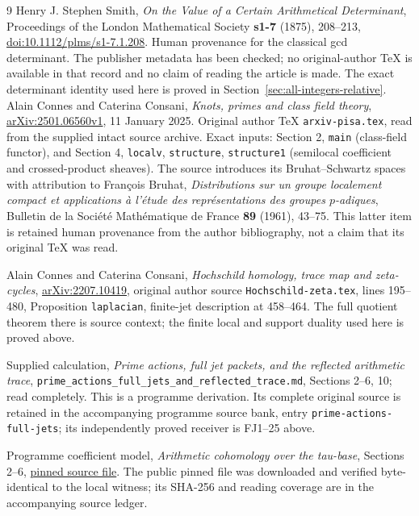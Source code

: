 \documentclass[11pt,a4paper]{article}
\theoremstyle{definition}\newtheorem{definition}[theorem]{Definition}
\begin{document}
\begin{thebibliography}{9}
Henry J. Stephen Smith, \emph{On the Value of a Certain Arithmetical Determinant},
Proceedings of the London Mathematical Society \textbf{s1-7} (1875), 208--213,
\href{https://doi.org/10.1112/plms/s1-7.1.208}{doi:10.1112/plms/s1-7.1.208}.
Human provenance for the classical gcd determinant. The publisher metadata
has been checked; no original-author TeX is available in that record and
no claim of reading the article is made. The exact determinant identity
used here is proved in Section~\ref{sec:all-integers-relative}.
Alain Connes and Caterina Consani, \emph{Knots, primes and class field theory},
\href{https://arxiv.org/abs/2501.06560v1}{arXiv:2501.06560v1}, 11 January 2025.
Original author TeX \texttt{arxiv-pisa.tex}, read from the supplied intact source
archive. Exact inputs: Section 2, \texttt{main} (class-field functor),
and Section 4, \texttt{localv}, \texttt{structure}, \texttt{structure1}
(semilocal coefficient and crossed-product sheaves).
The source introduces its Bruhat--Schwartz spaces with attribution to
Fran\c{c}ois Bruhat, \emph{Distributions sur un groupe localement compact
et applications \`a l'\'etude des repr\'esentations des groupes $p$-adiques},
Bulletin de la Soci\'et\'e Math\'ematique de France \textbf{89} (1961), 43--75.
This latter item is retained human provenance from the author bibliography,
not a claim that its original TeX was read.

 Alain Connes and Caterina Consani,
\emph{Hochschild homology, trace map and zeta-cycles},
\href{https://arxiv.org/abs/2207.10419}{arXiv:2207.10419}, original
author source \texttt{Hochschild-zeta.tex}, lines 195--480,
Proposition \texttt{laplacian}, finite-jet description at 458--464.
The full quotient theorem there is source context; the finite local
and support duality used here is proved above.

 Supplied calculation,
\emph{Prime actions, full jet packets, and the reflected arithmetic trace},
\texttt{prime\_actions\_full\_jets\_and\_reflected\_trace.md},
Sections 2--6, 10; read completely. This is a programme derivation. Its complete original source is retained in the accompanying programme source bank, entry \texttt{prime-actions-full-jets}; its independently proved receiver is FJ1--25 above.

 Programme coefficient model,
\emph{Arithmetic cohomology over the tau-base}, Sections 2--6,
\href{https://github.com/KokunoYumeto/zeta-function-research-reader/blob/4ba9285b66af58a6d58fc502a494c1fb45ca5b79/workbenches/tau-base-cohomology/TAU_BASE_MODEL.md}{pinned source file}.
The public pinned file was downloaded and verified byte-identical to
the local witness; its SHA-256 and reading coverage are in the
accompanying source ledger.


\end{thebibliography}
\end{document}
